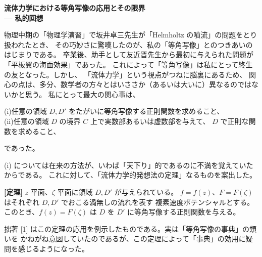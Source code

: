 \documentclass[uplatex,dvipdfmx]{jlreq}
\begin{document}
\newpage

\begin{center}
  {\Large\bfseries 流体力学における等角写像の応用とその限界\\
  \normalsize --- 私的回想}
\end{center}

\bigskip
\hspace*{\fill}{\large\bfseries 今井　功}

\bigskip

物理中期の「物理学演習」で坂井卓三先生が「Helmholtz の噴流」の問題をとり扱われたとき、
その巧妙さに驚嘆したのが、私の「等角写像」とのつきあいのはじまりである。
卒業後、助手として友近晋先生から最初に与えられた問題が「平板翼の海面効果」であった。
これによって「等角写像」は私にとって終生の友となった。しかし、
「流体力学」という視点がつねに脳裏にあるため、
関心の点は、多分、数学者の方々とはいささか（あるいは大いに）異なるのではないかと思う。
私にとって最大の関心事は、

\medskip
\noindent
(i)\quad 任意の領域 $D, D'$ をたがいに等角写像する正則関数を求めること、\\
(ii)\quad 任意の領域 $D$ の境界 $C$ 上で実数部あるいは虚数部を与えて、
$D$ で正則な関数を求めること、
\medskip

\noindent
であった。

(i) については在来の方法が、いわば「天下り」的であるのに不満を覚えていたからである。
これに対して、「流体力学的発想法の定理」なるものを案出した。

\bigskip

\begin{center}
\begin{minipage}[t]{11cm}
  \textbf{[定理]}\quad
  $z$ 平面、$\zeta$ 平面に領域 $D, D'$ が与えられている。
  $f = f(z)$、$F = F(\zeta)$ はそれぞれ $D, D'$ でおこる渦無しの流れを表す
  複素速度ポテンシャルとする。このとき、$f(z) = F(\zeta)$ は
  $D$ を $D'$ に等角写像する正則関数を与える。
\end{minipage}
\end{center}

\bigskip

拙著 [1] はこの定理の応用を例示したものである。実は「等角写像の事典」の類いを
かねがね意図していたのであるが、この定理によって「事典」の効用に疑問を感じるようになった。
\end{document}
